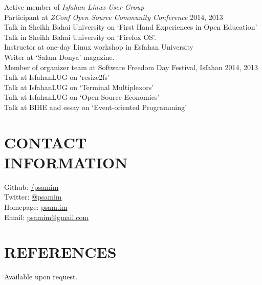 \documentclass[margin, 10pt]{res} %
\begin{document}
\begin{resume}
Active member of {\it Isfahan Linux User Group} \\
Participant at {\it ZConf Open Source Community Conference} 2014, 2013 \\
Talk in Sheikh Bahai University on `First Hand Experiences in Open Education' \\
Talk in Sheikh Bahai University on `Firefox OS'. \\
Instructor at one-day Linux workshop in Esfahan University \\
Writer at `Salam Donya' magazine. \\
Member of organizer team at Software Freedom Day Festival, Isfahan 2014, 2013 \\
Talk at IsfahanLUG on `resize2fs' \\
Talk at IsfahanLUG on `Terminal Multiplexors' \\
Talk at IsfahanLUG on `Open Source Economics' \\
Talk at BIHE and essay on `Event-oriented Programming'


\section{CONTACT \\ INFORMATION}
Github: \href{http://github.com/psamim}{/\/psamim} \\
Twitter: \href{http://twitter.com/psamim}{@psamim} \\
Homepage: \href{http://www.psam.im/}{psam.im} \\
Email: \href{mailto:psamim@gmail.com}{psamim@gmail.com}

\section{REFERENCES}
Available upon request.


\end{resume}
\end{document}
